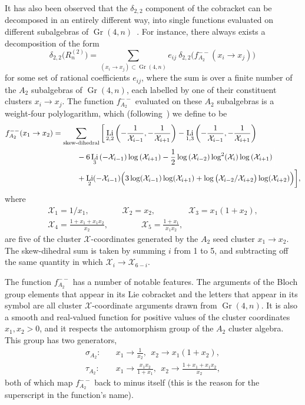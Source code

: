 \documentclass[11pt]{article}
\DeclareMathOperator{\Gr}{Gr}
\DeclareMathOperator{\Li}{Li}
\def\x{\mathcal{X}}
\begin{document}
It has also been observed that the $\delta_{2,2}$ component of the cobracket can be decomposed in an entirely different way, into single functions evaluated on different subalgebras of $\Gr(4,n)$~\cite{Golden:2014xqa}. For instance, there always exists a decomposition of the form
\begin{equation} \label{eq:a2_decomp}
	\delta_{2,2} \big(R_n^{(2)}\big) = \!\! \sum_{(x_i\to x_j) \subset \Gr(4,n)} \!\!\! e_{ij} ~\delta_{2,2}\big(f^{--}_{A_2}(x_i \to x_j) \big) \, 
\end{equation}
for some set of rational coefficients $e_{ij}$, where the sum is over a finite number of the $A_2$ subalgebras of $\Gr(4,n)$, each labelled by one of their constituent clusters $x_i \to x_j$. The function $f^{--}_{A_2}$ evaluated on these $A_2$ subalgebras is a weight-four polylogarithm, which (following~\cite{Golden:2018gtk}) we define to be
\begin{align}\label{def:a2-function}
        f^{--}_{A_2}(x_1 \to x_2)  &= \sum_{\text{skew-dihedral}} \bigg[ \Li_{2,2}\left(-\frac{1}{\x_{i-1}},-\frac{1}{\x_{i+1}}\right) - \Li_{1,3}\left(-\frac{1}{\x_{i-1}},-\frac{1}{\x_{i+1}}\right)  \\
        &\hspace{1.1cm} -6 \Li_3\left(-\x_{i-1}\right) \log \left(\x_{i+1}\right) -\frac{1}{2} \log \left(\x_{i-2}\right) \log^2\! \left(\x_i\right) \log \left(\x_{i+1}\right)  {\color{white} \bigg|} \nonumber \\
        &\hspace{1.1cm} +\Li_2(-\x_{i-1}) \Big(3 \log (\x_{i-1})\log (\x_{i+1})+\log \big(\x_{i-2}/\x_{i+2}\big)\log (\x_{i+2})\Big) \bigg], \nonumber
\end{align}
where 
\begin{gather}\label{def:a2-xcoords}
  \x_1 = 1/x_1, \qquad \qquad \x_2 = x_2, \qquad \qquad \x_3 = x_1(1+x_2), \\ 
  \x_4 = \frac{1+x_1+x_1 x_2}{x_2}, \qquad \qquad \x_5 = \frac{1+x_1}{x_1 x_2}, \nonumber
\end{gather}
are five of the cluster $\x$-coordinates generated by the $A_2$ seed cluster $x_1 \to x_2$. The skew-dihedral sum is taken by summing $i$ from 1 to 5, and subtracting off the same quantity in which $\x_i \to \x_{6-i}$.

The function $f^{--}_{A_2}$ has a number of notable features. The arguments of the Bloch group elements that appear in its Lie cobracket and the letters that appear in its symbol are all cluster $\x$-coordinate arguments drawn from $\Gr(4,n)$. It is also a smooth and real-valued function for positive values of the cluster coordinates $x_1, x_2>0$, and it respects the automorphism group of the $A_2$ cluster algebra. This group has two generators,
\begin{align} 
  \sigma_{A_2}:&\quad x_1\to \frac{1}{x_2},~~ x_2\to x_1(1+x_2), \label{eq:a2_automorphism_generator_1} \\
  \tau_{A_2}:&\quad  x_1 \to \frac{x_1 x_2}{1 + x_1}, ~~x_2 \to \frac{1 + x_1 + x_1 x_2}{x_2}, \label{eq:a2_automorphism_generator_2}
\end{align}
both of which map $f_{A_2}^{--}$ back to minus itself (this is the reason for the superscript in the function's name). 
\end{document}
